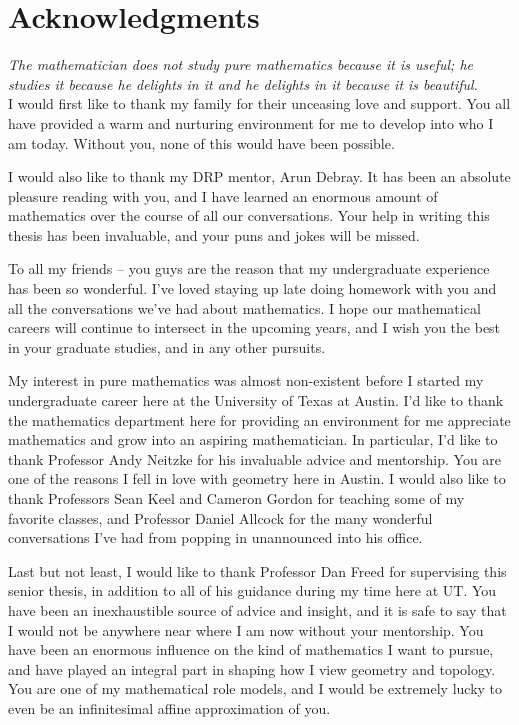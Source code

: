%
\chapter*{Acknowledgments}
%

%
\subsectionend $ $\\
%
\emph{The mathematician does not study pure mathematics because it is useful;
he studies it because he delights in it and he delights in it because it
is beautiful.} \\
%
%
\subsectionend $ $\\
%

I would first like to thank my family for their unceasing love and support.
You all have provided a warm and nurturing environment for me to develop into
who I am today. Without you, none of this would have been possible.

I would also like to thank my DRP mentor, Arun Debray. It has been an absolute
pleasure reading with you, and I have learned an enormous amount of mathematics
over the course of all our conversations. Your help in writing this thesis
has been invaluable, and your puns and jokes will be missed.

To all my friends -- you guys are the reason that my undergraduate experience
has been so wonderful. I've loved staying up late doing homework with you and
all the conversations we've had about mathematics. I hope our mathematical
careers will continue to intersect in the upcoming years, and I wish you
the best in your graduate studies, and in any other pursuits.

My interest in pure mathematics was almost non-existent before I started my
undergraduate career here at the University of Texas at Austin. I'd like to
thank the mathematics department here for providing an environment for me
appreciate mathematics and grow into an aspiring mathematician. In particular,
I'd like to thank Professor Andy Neitzke for his invaluable advice and mentorship.
You are one of the reasons I fell in love with geometry here in Austin.
I would also like to thank Professors Sean Keel and Cameron Gordon for teaching some
of my favorite classes, and Professor Daniel Allcock for the many wonderful conversations
I've had from popping in unannounced into his office.

Last but not least, I would like to thank Professor Dan Freed for supervising
this senior thesis, in addition to all of his guidance during my time here at UT.
You have been an inexhaustible source of advice and insight, and it is safe to
say that I would not be anywhere near where I am now without your mentorship.
You have been an enormous influence on the kind of mathematics I want to
pursue, and have played an integral part in shaping how I view geometry
and topology. You are one of my mathematical role models, and I would be extremely
lucky to even be an infinitesimal affine approximation of you.
%